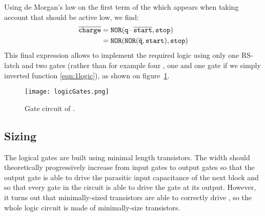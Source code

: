 Using de Morgan's law on the first term of the  which appears when taking account that  should be active low, we find:
\begin{align*}
\signot{charge} &= \gate{nor}(\sig{q}\cdot\signot{start}, \sig{stop})\\
&=\gate{nor}(\gate{nor}(\signot{q}, \sig{start}), \sig{stop})
\end{align*}
This final expression allows to implement the required logic using only one RS-latch and two  gates (rather than for example four , one  and one  gate if we simply inverted function \ref{eqn:1logic}), as shown on figure~\ref{fig:blklogic}.
\begin{figure}
  \centering
  \texttt{[image: logicGates.png]}
  \caption{Gate circuit of .\label{fig:blklogic}}
\end{figure}

\subsection{Sizing}
The logical gates are built using minimal length transistors. The width should theoretically progressively increase from input gates to output gates so that the output gate is able to drive the parasitic input capacitance of the next block and so that every gate in the circuit is able to drive the gate at its output. However, it turns out that minimally-sized transistors are able to correctly drive , so the whole logic circuit is made of minimally-size transistors.
